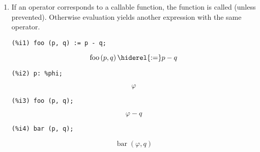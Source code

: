 \documentclass[12pt,leqno]{article}
\begin{document}
\begin{enumerate}
\item If an operator corresponds to a callable function,
the function is called (unless prevented).
Otherwise evaluation yields another expression with the same operator.
\begin{verbatim}
(%i1) foo (p, q) := p - q;
\end{verbatim}
\begin{dmath}[number={\(\mathop{\mathrm{\%o}_{1}}\)}]
\mathop{\mathrm{foo}}\left(p, q\right) \hiderel{:=} p-q
\end{dmath}
\begin{verbatim}
(%i2) p: %phi;
\end{verbatim}
\begin{dmath}[number={\(\mathop{\mathrm{\%o}_{2}}\)}]
\varphi
\end{dmath}
\begin{verbatim}
(%i3) foo (p, q);
\end{verbatim}
\begin{dmath}[number={\(\mathop{\mathrm{\%o}_{3}}\)}]
\varphi-q
\end{dmath}
\begin{verbatim}
(%i4) bar (p, q);
\end{verbatim}
\begin{dmath}[number={\(\mathop{\mathrm{\%o}_{4}}\)}]
\mathop{\mathrm{bar}}\left(\varphi, q\right)
\end{dmath}



\end{enumerate}
\end{document}
